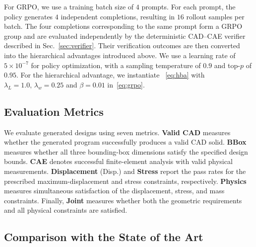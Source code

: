 For GRPO, we use a training batch size of \(4\) prompts. For each prompt, the policy generates \(4\) independent completions, resulting in \(16\) rollout samples per batch. The four completions corresponding to the same prompt form a GRPO group and are evaluated independently by the deterministic CAD--CAE verifier described in Sec.~\ref{sec:verifier}. Their verification outcomes are then converted into the hierarchical advantages introduced above. We use a learning rate of \(5\times10^{-7}\) for policy optimization, with a sampling temperature of \(0.9\) and top-\(p\) of \(0.95\). For the hierarchical advantage, we instantiate ~\eqref{eq:hba} with
$
    \lambda_L = 1.0,\,
    \lambda_w = 0.25
$
and $\beta=0.01$ in~\eqref{eq:grpo}.





\subsection{Evaluation Metrics}
\label{sec:metrics}

We evaluate generated designs using seven metrics. \textbf{Valid CAD} measures whether the generated program successfully produces a valid CAD solid. \textbf{BBox} measures whether all three bounding-box dimensions satisfy the specified design bounds. \textbf{CAE} denotes successful finite-element analysis with valid physical measurements. \textbf{Displacement} (Disp.) and \textbf{Stress} report the pass rates for the prescribed maximum-displacement and stress constraints, respectively. \textbf{Physics} measures simultaneous satisfaction of the displacement, stress, and mass constraints. Finally, \textbf{Joint} measures whether both the geometric requirements and all physical constraints are satisfied.


\subsection{Comparison with the State of the Art}
\label{sec:sota}

